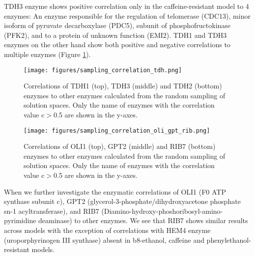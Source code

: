 \vspace{-1cm}

TDH3 enzyme shows positive correlation only in the caffeine-resistant model to 4 enzymes: An enzyme responsible for the regulation of telomerase (CDC13), minor isoform of pyruvate decarboxylase (PDC5), subunit of phosphofructokinase (PFK2), and to a protein of unknown function (EMI2). TDH1 and TDH3 enzymes on the other hand show both positive and negative correlations to multiple enzymes (Figure \ref{fig:sampling_correlation_tdh}).

\begin{figure}[H]
  \begin{center}
  \texttt{[image: figures/sampling\_correlation\_tdh.png]}
  \caption[Correlations of TDH1 (top), TDH3 (middle) and TDH2 (bottom) enzymes to other enzymes calculated from the random sampling of solution spaces. Only the name of enzymes with the correlation value c$>$0.5 are shown in the y-axes]{Correlations of TDH1 (top), TDH3 (middle) and TDH2 (bottom) enzymes to other enzymes calculated from the random sampling of solution spaces. Only the name of enzymes with the correlation value c$>$0.5 are shown in the y-axes.}
  \label{fig:sampling_correlation_tdh}
  \end{center}
\end{figure}


\begin{figure}[H]
  \begin{center}
  \texttt{[image: figures/sampling\_correlation\_oli\_gpt\_rib.png]}
  \caption[Correlations of OLI1 (top), GPT2 (middle) and RIB7 (bottom) enzymes to other enzymes calculated from the random sampling of solution spaces. Only the name of enzymes with the correlation value c$>$0.5 are shown in the y-axes]{Correlations of OLI1 (top), GPT2 (middle) and RIB7 (bottom) enzymes to other enzymes calculated from the random sampling of solution spaces. Only the name of enzymes with the correlation value c$>$0.5 are shown in the y-axes.}
  \label{fig:sampling_correlation_oli_gpt_rib}
  \end{center}
\end{figure}


When we further investigate the enzymatic correlations of OLI1 (F0 ATP synthase subunit c), GPT2 (glycerol-3-phosphate/dihydroxyacetone phosphate sn-1 acyltransferase), and RIB7 (Diamino-hydroxy-phoshoribosyl-amino-pyrimidine deaminase) to other enzymes. We see that RIB7 shows similar results across models with the exception of correlations with HEM4 enzyme (uroporphyrinogen III synthase) absent in b8-ethanol, caffeine and phenylethanol-resistant models.

